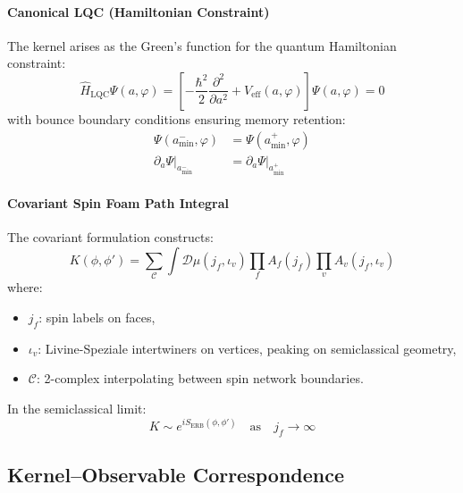 \paragraph{Canonical LQC (Hamiltonian Constraint)}
The kernel arises as the Green’s function for the quantum Hamiltonian constraint:
\begin{equation}
\hat{H}_{\text{LQC}}\Psi(a,\varphi) = \left[
    -\frac{\hbar^2}{2}\frac{\partial^2}{\partial a^2} 
    + V_{\text{eff}}(a,\varphi)
\right]\Psi(a,\varphi) = 0
\end{equation}
with bounce boundary conditions ensuring memory retention:
\begin{align}
\Psi(a_{\text{min}}^-, \varphi) &= \Psi(a_{\text{min}}^+, \varphi) \\
\partial_a\Psi\big|_{a_{\text{min}}^-} &= \partial_a\Psi\big|_{a_{\text{min}}^+}
\end{align}

\paragraph{Covariant Spin Foam Path Integral}
The covariant formulation constructs:
\begin{equation}
K(\phi,\phi') = \sum_{\mathcal{C}} \int \mathcal{D}\mu(j_f, \iota_v) 
    \prod_f A_f(j_f) 
    \prod_v A_v(j_f, \iota_v)
\end{equation}
where:
\begin{itemize}
    \item \(j_f\): spin labels on faces,
    \item \(\iota_v\): Livine-Speziale intertwiners on vertices, peaking on semiclassical geometry,
    \item \(\mathcal{C}\): 2-complex interpolating between spin network boundaries.
\end{itemize}
In the semiclassical limit:
\begin{equation}
K \sim e^{i S_{\text{ERB}}(\phi,\phi')} \quad \text{as} \quad j_f \to \infty
\end{equation}

\subsection{Kernel–Observable Correspondence}
\label{subsec:observables}

